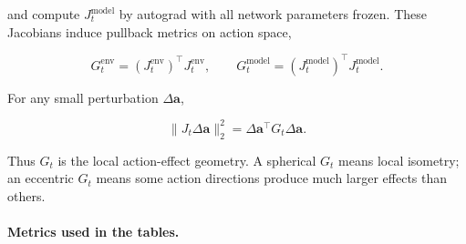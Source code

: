 ﻿\documentclass{article}
\begin{document}
and compute \(J^{\mathrm{model}}_t\) by autograd with all network parameters
frozen.  These Jacobians induce pullback metrics on action space,

\[
G^{\mathrm{env}}_t
=
\left(J^{\mathrm{env}}_t\right)^\top J^{\mathrm{env}}_t,
\qquad
G^{\mathrm{model}}_t
=
\left(J^{\mathrm{model}}_t\right)^\top J^{\mathrm{model}}_t.
\]

For any small perturbation \(\Delta \mathbf{a}\),

\[
\|J_t\Delta \mathbf{a}\|_2^2
=
\Delta \mathbf{a}^{\top}G_t\Delta \mathbf{a}.
\]

Thus \(G_t\) is the local action-effect geometry.  A spherical \(G_t\) means
local isometry; an eccentric \(G_t\) means some action directions produce much
larger effects than others.

\paragraph{Metrics used in the tables.}
\end{document}
